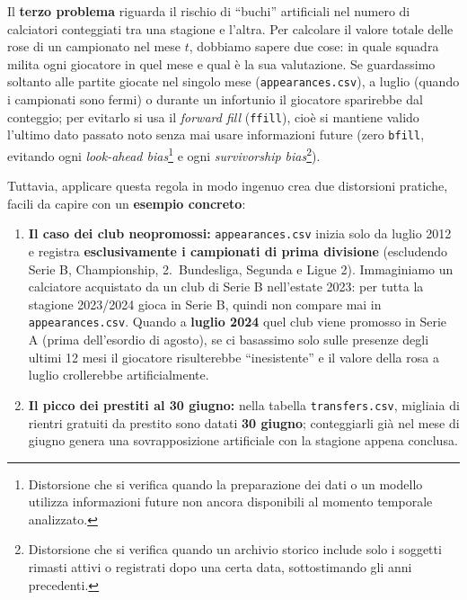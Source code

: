 Il \textbf{terzo problema} riguarda il rischio di ``buchi'' artificiali nel numero di calciatori conteggiati tra una stagione e l'altra. Per calcolare il valore totale delle rose di un campionato nel mese $t$, dobbiamo sapere due cose: in quale squadra milita ogni giocatore in quel mese e qual è la sua valutazione. Se guardassimo soltanto alle partite giocate nel singolo mese (\texttt{appearances.csv}), a luglio (quando i campionati sono fermi) o durante un infortunio il giocatore sparirebbe dal conteggio; per evitarlo si usa il \textit{forward fill} (\texttt{ffill}), cioè si mantiene valido l'ultimo dato passato noto senza mai usare informazioni future (zero \texttt{bfill}, evitando ogni \textit{look-ahead bias}\footnote{Distorsione che si verifica quando la preparazione dei dati o un modello utilizza informazioni future non ancora disponibili al momento temporale analizzato.} e ogni \textit{survivorship bias}\footnote{Distorsione che si verifica quando un archivio storico include solo i soggetti rimasti attivi o registrati dopo una certa data, sottostimando gli anni precedenti.}).

Tuttavia, applicare questa regola in modo ingenuo crea due distorsioni pratiche, facili da capire con un \textbf{esempio concreto}:
\begin{enumerate}
    \item \textbf{Il caso dei club neopromossi:} \texttt{appearances.csv} inizia solo da luglio 2012 e registra \textbf{esclusivamente i campionati di prima divisione} (escludendo Serie B, Championship, 2.\ Bundesliga, Segunda e Ligue 2). Immaginiamo un calciatore acquistato da un club di Serie B nell'estate 2023: per tutta la stagione 2023/2024 gioca in Serie B, quindi non compare mai in \texttt{appearances.csv}. Quando a \textbf{luglio 2024} quel club viene promosso in Serie A (prima dell'esordio di agosto), se ci basassimo solo sulle presenze degli ultimi 12 mesi il giocatore risulterebbe ``inesistente'' e il valore della rosa a luglio crollerebbe artificialmente.
    \item \textbf{Il picco dei prestiti al 30 giugno:} nella tabella \texttt{transfers.csv}, migliaia di rientri gratuiti da prestito sono datati \textbf{30 giugno}; conteggiarli già nel mese di giugno genera una sovrapposizione artificiale con la stagione appena conclusa.
\end{enumerate}

